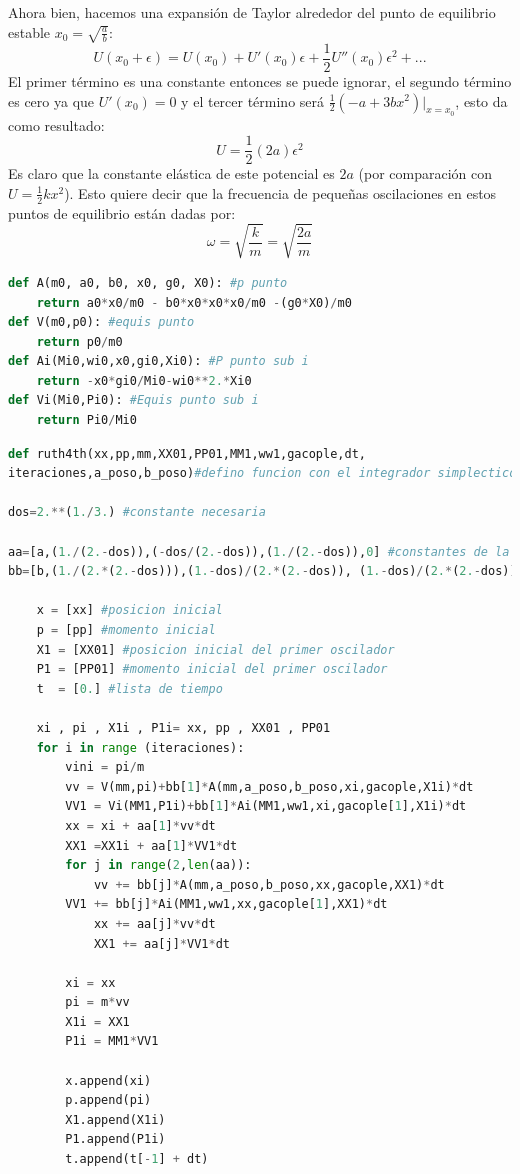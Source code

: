 \documentclass[idxtotoc,hyperref,openany]{labbook} %
\begin{document}
Ahora bien, hacemos una expansión de Taylor alrededor del punto de equilibrio estable $x_0=\sqrt{\frac{a}{b}}$:
\begin{equation}
U(x_0 +\epsilon )=U(x_0)+U'(x_0)\epsilon + \frac{1}{2}U''(x_0)\epsilon ^2 + ...
\end{equation}
El primer término es una constante entonces se puede ignorar, el segundo término es cero ya que $U'(x_0)=0$ y el tercer término será $\frac{1}{2}(-a+3bx^2)| _{x=x_0}$, esto da como resultado:
\begin{equation}
U=\frac{1}{2}(2a)\epsilon ^2
\end{equation}
Es claro que la constante elástica de este potencial es $2a$ (por comparación con $U=\frac{1}{2}kx^2$). Esto quiere decir que la frecuencia de pequeñas oscilaciones en estos puntos de equilibrio están dadas por:
\begin{equation}
\omega =\sqrt{\frac{k}{m}}=\sqrt{\frac{2a}{m}}
\end{equation}

\begin{lstlisting}[language=Python]
def A(m0, a0, b0, x0, g0, X0): #p punto
    return a0*x0/m0 - b0*x0*x0*x0/m0 -(g0*X0)/m0
def V(m0,p0): #equis punto
    return p0/m0
def Ai(Mi0,wi0,x0,gi0,Xi0): #P punto sub i
    return -x0*gi0/Mi0-wi0**2.*Xi0
def Vi(Mi0,Pi0): #Equis punto sub i
    return Pi0/Mi0
\end{lstlisting}

\begin{lstlisting}[language=Python]
def ruth4th(xx,pp,mm,XX01,PP01,MM1,ww1,gacople,dt,
iteraciones,a_poso,b_poso)#defino funcion con el integrador simplectico Ruth de 4to orden

dos=2.**(1./3.) #constante necesaria

aa=[a,(1./(2.-dos)),(-dos/(2.-dos)),(1./(2.-dos)),0] #constantes de la posicion del integrador
bb=[b,(1./(2.*(2.-dos))),(1.-dos)/(2.*(2.-dos)), (1.-dos)/(2.*(2.-dos)),(1./(2.*(2.-dos)))] #constantes de la velocidad del integrador

    x = [xx] #posicion inicial
    p = [pp] #momento inicial
    X1 = [XX01] #posicion inicial del primer oscilador
    P1 = [PP01] #momento inicial del primer oscilador
    t  = [0.] #lista de tiempo
    
    xi , pi , X1i , P1i= xx, pp , XX01 , PP01
    for i in range (iteraciones):
        vini = pi/m
        vv = V(mm,pi)+bb[1]*A(mm,a_poso,b_poso,xi,gacople,X1i)*dt
        VV1 = Vi(MM1,P1i)+bb[1]*Ai(MM1,ww1,xi,gacople[1],X1i)*dt
        xx = xi + aa[1]*vv*dt
        XX1 =XX1i + aa[1]*VV1*dt
        for j in range(2,len(aa)):
            vv += bb[j]*A(mm,a_poso,b_poso,xx,gacople,XX1)*dt
	    VV1 += bb[j]*Ai(MM1,ww1,xx,gacople[1],XX1)*dt
            xx += aa[j]*vv*dt
            XX1 += aa[j]*VV1*dt

        xi = xx
        pi = m*vv
        X1i = XX1
        P1i = MM1*VV1

        x.append(xi)
        p.append(pi) 
        X1.append(X1i)
        P1.append(P1i) 
        t.append(t[-1] + dt)
\end{lstlisting}
\end{document}
